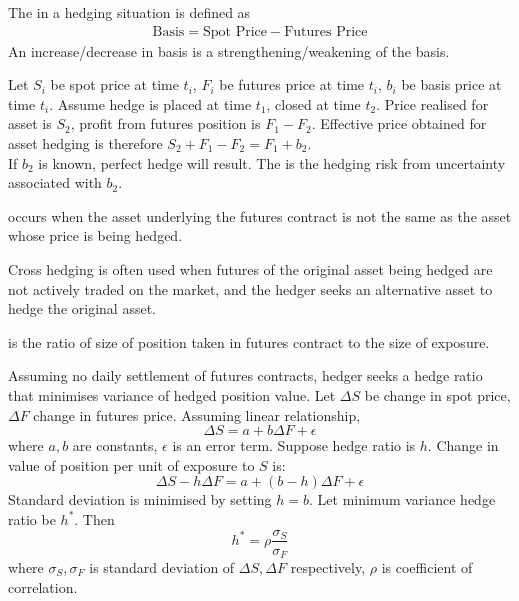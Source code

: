 \begin{definition}
The  in a hedging situation is defined as
\begin{align*}
\text{Basis} = \text{Spot Price} - \text{Futures Price} \nonumber
\end{align*}
An increase/decrease in basis is a strengthening/weakening of the basis.
\end{definition}

\begin{definition}
Let $S_i$ be spot price at time $t_i$, $F_i$ be futures price at time $t_i$, $b_i$ be basis price at time $t_i$.	 Assume hedge is placed at time $t_1$, closed at time $t_2$. Price realised for asset is $S_2$, profit from futures position is $F_1 - F_2$.  Effective price obtained for asset hedging is therefore $S_2 + F_1 - F_2 = F_1 + b_2$.\\
If $b_2$ is known, perfect hedge will result. The  is the hedging risk from uncertainty associated with $b_2$.
\end{definition}

\begin{definition}
 occurs when the asset underlying the futures contract is not the same as the asset whose price is being hedged.
\end{definition}

Cross hedging is often used when futures of the original asset being hedged are not actively traded on the market, and the hedger seeks an alternative asset to hedge the original asset.

\begin{definition}
 is the ratio of size of position taken in futures contract to the size of exposure.
\end{definition}

Assuming no daily settlement of futures contracts, hedger seeks a hedge ratio that minimises variance of hedged position value. Let $\Delta S$ be change in spot price, $\Delta F$ change in futures price. Assuming linear relationship,
\begin{equation*}
\Delta S = a + b \Delta F + \epsilon	 \nonumber
\end{equation*}
where $a,b$ are constants, $\epsilon$ is an error term. Suppose hedge ratio is $h$. Change in value of position per unit of exposure to $S$ is:
\begin{equation*}
\Delta S - h \Delta F = a + (b-h) \Delta F + \epsilon \nonumber
\end{equation*}
Standard deviation is minimised by setting $h=b$. Let minimum variance hedge ratio be $h^*$. Then
\begin{equation*}
h^* = \rho \frac{\sigma_S}{\sigma_F} \nonumber
\end{equation*}
where $\sigma_S, \sigma_F$ is standard deviation of $\Delta S, \Delta F$ respectively, $\rho$ is coefficient of correlation.

